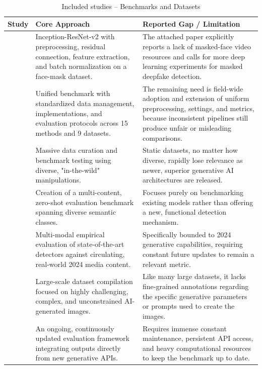 \documentclass[sn-mathphys-num,Numbered,pdflatex]{sn-jnl}
\begin{document}
\begin{table}[htbp]
\caption{Included studies -- Benchmarks and Datasets}
\label{tab:benchmark_dataset}
\centering\footnotesize
\begin{tabularx}{\columnwidth}{@{}p{} X X@{}}
\toprule
\textbf{Study} & \textbf{Core Approach} & \textbf{Reported Gap / Limitation} \\
\midrule
\cite{DffmdA3} & Inception-ResNet-v2 with preprocessing, residual connection, feature extraction, and batch normalization on a face-mask dataset. & The attached paper explicitly reports a lack of masked-face video resources and calls for more deep learning experiments for masked deepfake detection. \\
\cite{DeepfakebenchA4} & Unified benchmark with standardized data management, implementations, and evaluation protocols across 15 methods and 9 datasets. & The remaining need is field-wide adoption and extension of uniform preprocessing, settings, and metrics, because inconsistent pipelines still produce unfair or misleading comparisons. \\
\cite{TowardsRealworld56} & Massive data curation and benchmark testing using diverse, "in-the-wild" manipulations. & Static datasets, no matter how diverse, rapidly lose relevance as newer, superior generative AI architectures are released. \\
\cite{ImaginetA60} & Creation of a multi-content, zero-shot evaluation benchmark spanning diverse semantic classes. & Focuses purely on benchmarking existing models rather than offering a new, functional detection mechanism. \\
\cite{Deepfakeeval2024A64} & Multi-modal empirical evaluation of state-of-the-art detectors against circulating, real-world 2024 media content. & Specifically bounded to 2024 generative capabilities, requiring constant future updates to remain a relevant metric. \\
\cite{WildfakeA66} & Large-scale dataset compilation focused on highly challenging, complex, and unconstrained AI-generated images. & Like many large datasets, it lacks fine-grained annotations regarding the specific generative parameters or prompts used to create the images. \\
\cite{AigenbenchA72} & An ongoing, continuously updated evaluation framework integrating outputs directly from new generative APIs. & Requires immense constant maintenance, persistent API access, and heavy computational resources to keep the benchmark up to date. \\
\bottomrule
\end{tabularx}
\end{table}
\FloatBarrier
\end{document}
